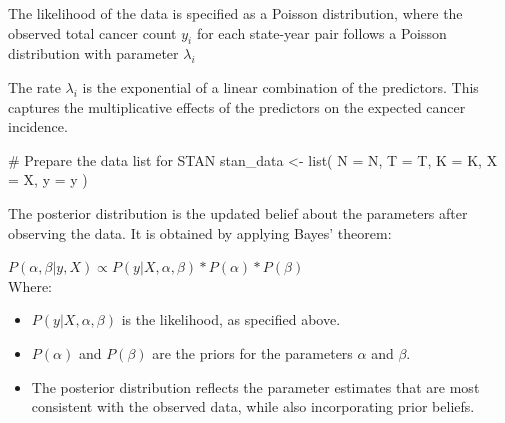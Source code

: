 \documentclass[
  12pt,
]{article}
\newenvironment{Shaded}{\begin{snugshade}}{\end{snugshade}}
\newcommand{\AttributeTok}[1]{\textcolor[rgb]{0.40,0.45,0.13}{#1}}
\newcommand{\CommentTok}[1]{\textcolor[rgb]{0.37,0.37,0.37}{#1}}
\newcommand{\FunctionTok}[1]{\textcolor[rgb]{0.28,0.35,0.67}{#1}}
\newcommand{\NormalTok}[1]{\textcolor[rgb]{0.00,0.23,0.31}{#1}}
\newcommand{\OtherTok}[1]{\textcolor[rgb]{0.00,0.23,0.31}{#1}}
\newcommand{\SpecialCharTok}[1]{\textcolor[rgb]{0.37,0.37,0.37}{#1}}
\begin{document}
\begin{Shaded}
\end{Shaded}

The likelihood of the data is specified as a Poisson distribution, where
the observed total cancer count \(y_i\) for each state-year pair follows
a Poisson distribution with parameter \(λ_i\)

The rate \(λ_i\) is the exponential of a linear combination of the
predictors. This captures the multiplicative effects of the predictors
on the expected cancer incidence.

\begin{Shaded}
\begin{Highlighting}[]
\CommentTok{\# Prepare the data list for STAN}
\NormalTok{stan\_data }\OtherTok{\textless{}{-}} \FunctionTok{list}\NormalTok{(}
  \AttributeTok{N =}\NormalTok{ N,}
  \AttributeTok{T =}\NormalTok{ T,}
  \AttributeTok{K =}\NormalTok{ K,}
  \AttributeTok{X =}\NormalTok{ X,}
  \AttributeTok{y =}\NormalTok{ y}
\NormalTok{)}
\end{Highlighting}
\end{Shaded}

The posterior distribution is the updated belief about the parameters
after observing the data. It is obtained by applying Bayes' theorem:

\(P(α, β | y, X) ∝ P(y | X, α, β) * P(α) * P(β)\)\\
Where:

\begin{itemize}
\item
  \(P(y | X, α, β)\) is the likelihood, as specified above.
\item
  \(P(α)\) and \(P(β)\) are the priors for the parameters \(α\) and
  \(β\).
\item
  The posterior distribution reflects the parameter estimates that are
  most consistent with the observed data, while also incorporating prior
  beliefs.
\end{itemize}
\end{document}
